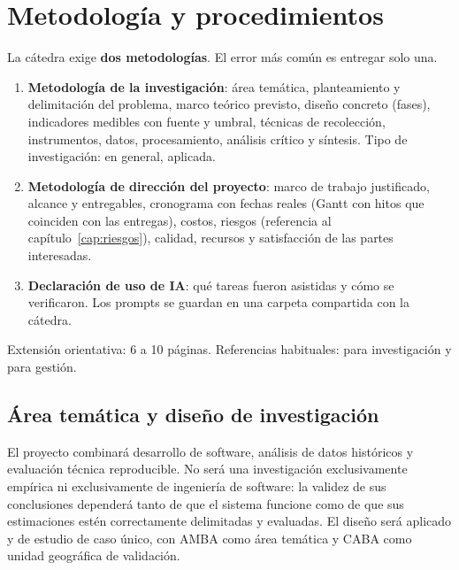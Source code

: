 
\chapter{Metodología y procedimientos}\label{cap:metodologia}

\begin{guia}
La cátedra exige \textbf{dos metodologías}. El error más común es
entregar solo una.
\begin{enumerate}
    \item \textbf{Metodología de la investigación}: área temática,
          planteamiento y delimitación del problema, marco teórico
          previsto, diseño concreto (fases), indicadores medibles con
          fuente y umbral, técnicas de recolección, instrumentos, datos,
          procesamiento, análisis crítico y síntesis. Tipo de
          investigación: en general, aplicada.
    \item \textbf{Metodología de dirección del proyecto}: marco de trabajo
          justificado, alcance y entregables, cronograma con fechas reales
          (Gantt con hitos que coinciden con las entregas), costos, riesgos
          (referencia al capítulo~\ref{cap:riesgos}), calidad, recursos y
          satisfacción de las partes interesadas.
    \item \textbf{Declaración de uso de IA}: qué tareas fueron asistidas y
          cómo se verificaron. Los prompts se guardan en una carpeta
          compartida con la cátedra.
\end{enumerate}
Extensión orientativa: 6 a 10 páginas. Referencias habituales:
\citet{hernandezsampieri2014} para investigación y \citet{pmi2021}
para gestión.
\end{guia}

\section{Área temática y diseño de investigación}

El proyecto combinará desarrollo de software, análisis de datos
históricos y evaluación técnica reproducible. No será una investigación
exclusivamente empírica ni exclusivamente de ingeniería de software: la
validez de sus conclusiones dependerá tanto de que el sistema funcione
como de que sus estimaciones estén correctamente delimitadas y
evaluadas. El diseño será aplicado y de estudio de caso único, con AMBA
como área temática y CABA como unidad geográfica de validación.


